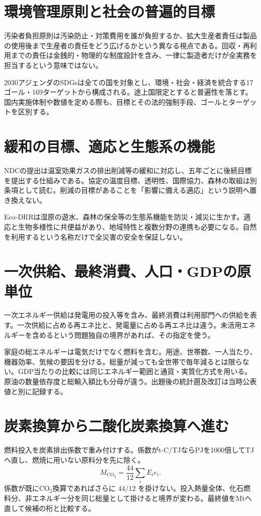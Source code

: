 \section{環境管理原則と社会の普遍的目標}
\label{theory:env:principles}
\label{theory:env:sdgs}
汚染者負担原則は汚染防止・対策費用を誰が負担するか、拡大生産者責任は製品の使用後まで生産者の責任をどう広げるかという異なる視点である。回収・再利用までの責任は金銭的・物理的な制度設計を含み、一律に製造者だけが全実務を担当するという意味ではない。\cite{env59_epr}

2030アジェンダのSDGsは全ての国を対象とし、環境・社会・経済を統合する17ゴール・169ターゲットから構成される。途上国限定とすると普遍性を落とす。国内実施体制や数値を定める際も、目標とその法的強制手段、ゴールとターゲットを区別する。\cite{env_sdgs_un,env_sdgs2016}

\section{緩和の目標、適応と生態系の機能}
\label{theory:env:paris}
\label{theory:env:ecodrr}
NDCの提出は温室効果ガスの排出削減等の緩和に対応し、五年ごとに後続目標を提出する仕組みである。協定の温度目標、透明性、国際協力、森林の取組は別条項として読む。削減の目標があることを「影響に備える適応」という説明へ置き換えない。\cite{env59_ndc}

Eco-DRRは湿原の遊水、森林の保全等の生態系機能を防災・減災に生かす。適応と生物多様性に共便益があり、地域特性と複数分野の連携も必要になる。自然を利用するという名称だけで全災害の安全を保証しない。\cite{env59_ecodrr}

\section{一次供給、最終消費、人口・GDPの原単位}
\label{theory:env:home}
\label{theory:env:oil2017}
\label{theory:env:primaryshare}
\label{theory:env:energytrends}
一次エネルギー供給は発電用の投入等を含み、最終消費は利用部門への供給を表す。一次供給に占める再エネ比と、発電量に占める再エネ比は違う。未活用エネルギーを含めるという問題独自の境界があれば、その指定を使う。

家庭の総エネルギーは電気だけでなく燃料を含む。用途、世帯数、一人当たり、機器効率、気候の要因を分ける。総量が減っても全世帯で毎年減るとは限らない。GDP当たりの比較には同じエネルギー範囲と通貨・実質化方式を用いる。原油の数量依存度と総輸入額比も分母が違う。出題後の統計遡及改訂は当時公表値と別に記録する。\cite{env59_energy2019}

\section{炭素換算から二酸化炭素換算へ進む}
\label{theory:env:nationalco2}
燃料投入を炭素排出係数で重み付けする。係数がt-C/TJならPJを1000倍してTJへ直し、燃焼に用いない原料分を先に除く。
\[
 M_{\mathrm{CO_2}}=\frac{44}{12}\sum_i E_i e_i .
\]
係数が既にCO\(_2\)換算であればさらに \(44/12\) を掛けない。投入熱量全体、化石燃料分、非エネルギー分を同じ総量として掛けると境界が変わる。最終値をMtへ直して候補の桁と比較する。

